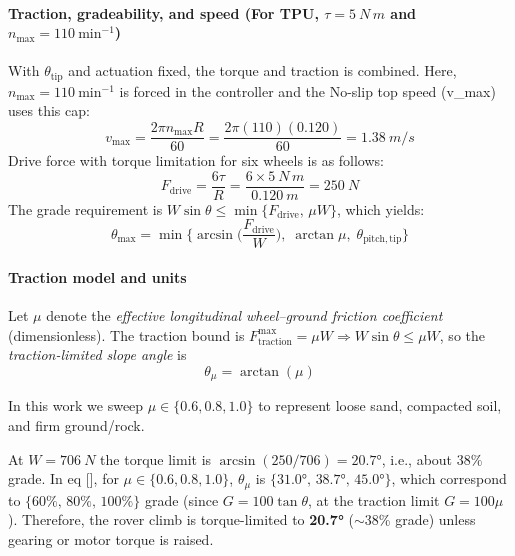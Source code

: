 \documentclass[letterpaper, 10 pt, conference]{ieeeconf}  %
\begin{document}
\paragraph*{Traction, gradeability, and speed \texorpdfstring{ (For TPU, \(\tau=\SI{5}{N\,m}\) and \(n_{\max}=\SI{110}{\minute^{-1}}\))}{(TPU, tau=5 N m, n\_max=110 min^{-1})}} With \(\theta_{\mathrm{tip}}\) and actuation fixed, the torque and traction is combined.  
Here, \(n_{\max}=\SI{110}{\minute^{-1}}\) is forced in the controller and the No-slip top speed (v\_max) uses this cap:
\begin{equation}
v_{\max}=\frac{2\pi n_{\max} R}{60}
=\frac{2\pi(110)(0.120)}{60}=\SI{1.38}{m/s}
\end{equation}
Drive force with torque limitation for six wheels is as follows:
\begin{equation}
F_{\mathrm{drive}}=\frac{6\tau}{R}
=\frac{6\times\SI{5}{N\,m}}{\SI{0.120}{m}}=\SI{250}{N}
\end{equation}
The grade requirement is \(W\sin\theta\le \min\{F_{\mathrm{drive}},\,\mu W\}\), which yields:
\begin{equation}
\theta_{\max} = \min\Big\{\arcsin\!\Big(\frac{F_{\mathrm{drive}}}{W}\Big),\;\arctan\mu,\;\theta_{\mathrm{pitch,tip}}\Big\}
\end{equation}
\paragraph*{Traction model and units}
Let $\mu$ denote the \emph{effective longitudinal wheel--ground friction coefficient} (dimensionless).
The traction bound is $F_{\text{traction}}^{\max}=\mu W \Rightarrow W\sin\theta \le \mu W$, so the
\emph{traction-limited slope angle} is
\[
\theta_\mu=\arctan(\mu)
\]

In this work we sweep $\mu\in\{0.6,0.8,1.0\}$ to represent loose sand, compacted soil, and firm ground/rock.


At $W=\SI{706}{N}$ the torque limit is $\arcsin(250/706)=\ang{20.7}$, i.e., about $38\%$ grade. In eq [], for $\mu\in\{0.6,0.8,1.0\}$, $\theta_\mu$ is 
$\{\ang{31.0},\,\ang{38.7},\,\ang{45.0}\}$, which correspond to
$\{60\%,\,80\%,\,100\%\}$ grade (since $G=100\tan\theta$, at the traction limit $G=100\mu$).
Therefore, the rover climb is torque-limited to \textbf{\ang{20.7}} ($\sim$38\% grade) unless gearing or motor torque is raised.
\end{document}
